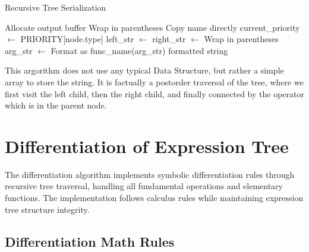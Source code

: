 \documentclass{report}
\begin{document}
\begin{algorithm}[H]
\caption{Recursive Tree Serialization}
\begin{algorithmic}[1]
        \State \Return {}
    \EndIf
    
    \State Allocate output buffer
            \State Wrap in parentheses
        \EndIf
        \State Copy name directly
        \State current\_priority $\gets$ PRIORITY[node.type]
        \State left\_str $\gets$ 
        \State right\_str $\gets$ 
            \State Wrap in parentheses
        \EndIf
        \State arg\_str $\gets$ 
        \State Format as func\_name(arg\_str)
    \EndIf
    \State \Return formatted string
\EndFunction
\end{algorithmic}
\end{algorithm}

This argorithm does not use any typical Data Structure, but rather a simple array to store the string. It is factually a postorder traversal of the tree, where we first visit the left child, then the right child, and finally connected by the operator which is in the parent node.


\section{Differentiation of Expression Tree}

The differentiation algorithm implements symbolic differentiation rules through recursive tree traversal, handling all fundamental operations and elementary functions. The implementation follows calculus rules while maintaining expression tree structure integrity.

\subsection*{Differentiation Math Rules}
\end{document}
